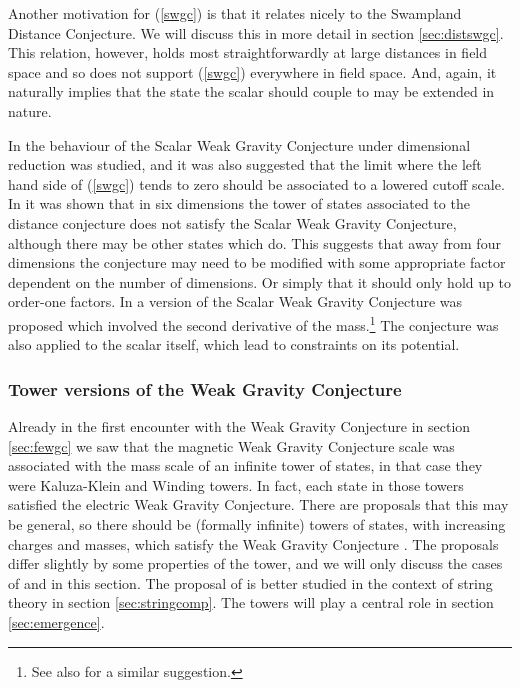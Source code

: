 \documentclass[11pt,a4paper]{article}
\numberwithin{equation}{section}
\numberwithin{table}{section}\setlength{\multlinegap}{25pt}
\begin{document}
Another motivation for (\ref{swgc}) is that it relates nicely to the Swampland Distance Conjecture. We will discuss this in more detail in section \ref{sec:distswgc}. This relation, however, holds most straightforwardly at large distances in field space and so does not support (\ref{swgc}) everywhere in field space. And, again, it naturally implies that the state the scalar should couple to may be extended in nature.  

In \cite{Lust:2017wrl} the behaviour of the Scalar Weak Gravity Conjecture under dimensional reduction was studied, and it was also suggested that the limit where the left hand side of (\ref{swgc}) tends to zero should be associated to a lowered cutoff scale. In \cite{Lee:2018spm} it was shown that in six dimensions the tower of states associated to the distance conjecture does not satisfy the Scalar Weak Gravity Conjecture, although there may be other states which do. This suggests that away from four dimensions the conjecture may need to be modified with some appropriate factor dependent on the number of dimensions. Or simply that it should only hold up to order-one factors. In \cite{Gonzalo:2019gjp} a version of the Scalar Weak Gravity Conjecture was proposed which involved the second derivative of the mass.\footnote{See also \cite{Palti:2017elp} for a similar suggestion.} The conjecture was also applied to the scalar itself, which lead to constraints on its potential.

\subsubsection{Tower versions of the Weak Gravity Conjecture}
\label{sec:wgctower}

Already in the first encounter with the Weak Gravity Conjecture in section \ref{sec:fewgc} we saw that the magnetic Weak Gravity Conjecture scale was associated with the mass scale of an infinite tower of states, in that case they were Kaluza-Klein and Winding towers. In fact, each state in those towers satisfied the electric Weak Gravity Conjecture. There are proposals that this may be general, so there should be (formally infinite) towers of states, with increasing charges and masses, which satisfy the Weak Gravity Conjecture \cite{Heidenreich:2015nta,Klaewer:2016kiy,Montero:2016tif,Heidenreich:2016aqi,Andriolo:2018lvp,Grimm:2018ohb}. The proposals differ slightly by some properties of the tower, and we will only discuss the cases of \cite{Heidenreich:2015nta,Montero:2015ofa,Heidenreich:2016aqi} and \cite{Andriolo:2018lvp} in this section. The proposal of \cite{Grimm:2018ohb} is better studied in the context of string theory in section \ref{sec:stringcomp}. The towers will play a central role in section \ref{sec:emergence}. 
\end{document}
